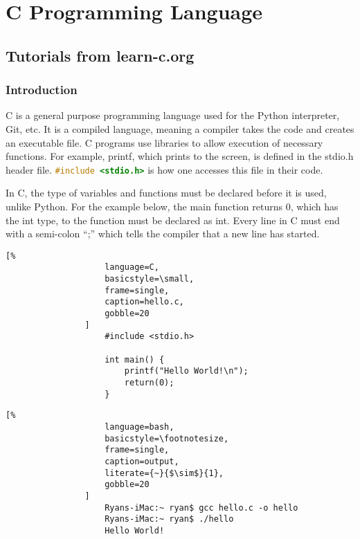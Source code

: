 \documentclass[crop=false,class=article,oneside]{standalone}
\begin{document}
    \ifx\ifcoursesprogrammingtutorials\undefined
        \section*{C Programming Language}
        \setcounter{section}{1}
    \fi
    \subsection{Tutorials from learn-c.org}
        \subsubsection{Introduction}
            C is a general purpose programming language used for the
            Python interpreter, Git, etc. It is a compiled language,
            meaning a compiler takes the code and creates an
            executable file. C programs use libraries to allow
            execution of necessary functions. For example, printf,
            which prints to the screen, is defined in the stdio.h
            header file.
            \lstinline[language=C]{#include <stdio.h>}
            is how one accesses this
            file in their code.
            \par\hfill\par
            In C, the type of variables and functions must be
            declared before it is used, unlike Python. For the
            example below, the main function returns 0, which has
            the int type, to the function must be declared as int.
            Every line in C must end with a semi-colon ``;''
            which tells the compiler that a new line has started.
            \newline
            \begin{minipage}[t]{.48\textwidth}
                \centering
                \begin{lstlisting}[%
                    language=C,
                    basicstyle=\small,
                    frame=single,
                    caption=hello.c,
                    gobble=20
                ]
                    #include <stdio.h>
                    
                    int main() {
                        printf("Hello World!\n");
                        return(0);
                    }
                \end{lstlisting}
            \end{minipage}\hfill
            \begin{minipage}[t]{.48\textwidth}
                \centering
                \begin{lstlisting}[%
                    language=bash,
                    basicstyle=\footnotesize,
                    frame=single,
                    caption=output,
                    literate={~}{$\sim$}{1},
                    gobble=20
                ]
                    Ryans-iMac:~ ryan$ gcc hello.c -o hello
                    Ryans-iMac:~ ryan$ ./hello
                    Hello World!
                \end{lstlisting}
            \end{minipage}
\end{document}
